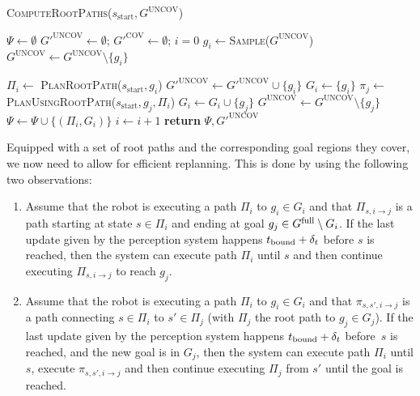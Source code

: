 \documentclass[conference]{IEEEtran}
\begin{document}
\begin{algorithm}[t]
\caption{\textsc{ComputeRootPaths}($s_{\textrm{start}}, G^{\textrm{UNCOV}}$)}
\label{alg:step1}
\begin{algorithmic}[1]
\State $\Psi \leftarrow \emptyset$   
\State $G'^{\textrm{UNCOV}} \leftarrow \emptyset$; \hspace{3mm}
       $G'^{\textrm{COV}} \leftarrow \emptyset$; \hspace{3mm}
       $i = 0$
    \State $g_i \leftarrow$\textsc{Sample}($G^{\textrm{UNCOV}}$)
    \State $G^{\textrm{UNCOV}}\leftarrow G^{\textrm{UNCOV}} \setminus \{g_i\}$
    
    \State $\Pi_i \leftarrow$ \textsc{PlanRootPath}($s_{\textrm{start}}, g_i$)
      
        \State $G'^{\textrm{UNCOV}} \leftarrow G'^{\textrm{UNCOV}} \cup \{g_i\}$
    \Else
        \State $G_i \leftarrow \{ g_i \}$
            \State $\pi_j \leftarrow$\textsc{PlanUsingRootPath}($s_{\textrm{start}},g_j,\Pi_i$)
             
                \State $G_i \leftarrow G_i \cup \{g_j\}$
                \State $G^{\textrm{UNCOV}} \leftarrow G^{\textrm{UNCOV}} \setminus \{g_j\}$
            \EndIf
        \EndFor
        \State $\Psi \leftarrow \Psi \cup \{ (\Pi_i, G_i)\}$
        \State $i \leftarrow i + 1$
    \EndIf
\EndWhile
\State \textbf{return} $\Psi, G'^{\textrm{UNCOV}}$
\end{algorithmic}
\end{algorithm}

Equipped with a set of root paths and the corresponding goal regions they cover, we now need to allow for efficient replanning. This is done by using the following two observations:
\begin{enumerate}[label={\textbf{O\arabic*}},leftmargin=0.75cm]
    \item \label{obs:1} 
    Assume that the robot is executing a path $\Pi_i$ to $g_i \in G_i$ and that $\Pi_{s, i \rightarrow j}$ is a path starting at state $s \in \Pi_i$ and ending at goal $g_j \in G^{\textrm{full}} \setminus G_i$.
    If the last update given by the perception system happens $t_{\textrm{bound}} + \delta_t$ before $s$ is reached,
    then the system can execute path $\Pi_i$ until $s$ and then continue executing $\Pi_{s, i \rightarrow j}$ to reach  $g_j$.

    \item \label{obs:2} 
    Assume that the robot is executing a path $\Pi_i$ to $g_i \in G_i$ and that $\pi_{s,s',i \rightarrow j}$ is a path connecting  $s \in \Pi_i$ to $s' \in \Pi_j$ (with $\Pi_j$ the root path to $g_j \in G_j$).
    If the last update given by the perception system happens $t_{\textrm{bound}} + \delta_t$ before~$s$ is reached,
    and the new goal is in $G_j$,
    then the system can execute path $\Pi_i$ until $s$, execute $\pi_{s,s',i \rightarrow j}$ and then continue executing $\Pi_{j}$ from $s'$ until the goal is reached.
\end{enumerate}
\end{document}
